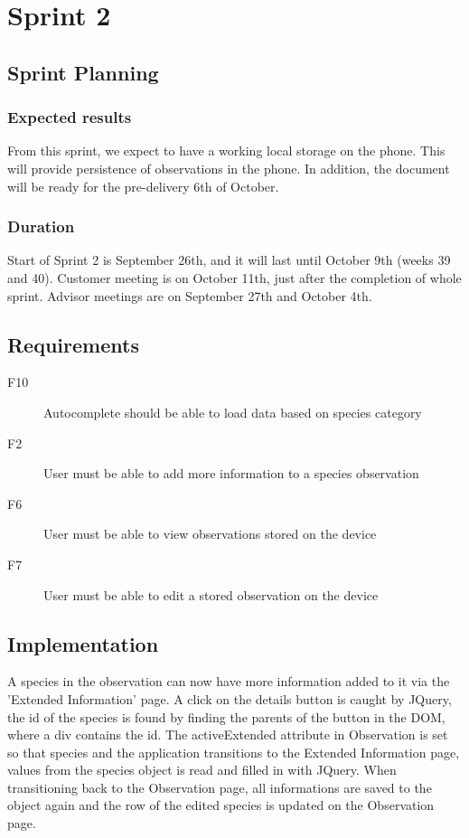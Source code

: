 \section{Sprint 2}

\subsection{Sprint Planning}

	\subsubsection{Expected results}
  From this sprint, we expect to have a working local storage on the phone. This will provide persistence of observations in the phone. In addition, the document will be ready for the pre-delivery 6th of October.
	
	\subsubsection{Duration}
	Start of Sprint 2 is September 26th, and it will last until October 9th (weeks 39 and 40). Customer meeting is on October 11th, just after the completion of whole sprint. Advisor meetings are on September 27th and October 4th.

\subsection{Requirements}

\begin{description}
	\item[F10] Autocomplete should be able to load data based on species category
	\item[F2] User must be able to add more information to a species observation
	\item[F6] User must be able to view observations stored on the device
	\item[F7] User must be able to edit a stored observation on the device
\end{description}

\subsection{Implementation}

A species in the observation can now have more information added to it via the 'Extended Information' page.
A click on the details button is caught by JQuery, the id of the species is found by finding the parents of the button in the DOM, where a div contains the id.
The activeExtended attribute in Observation is set so that species and the application transitions to the Extended Information page, values from the species object is read and filled in with JQuery.
When transitioning back to the Observation page, all informations are saved to the object again and the row of the edited species is updated on the Observation page.

